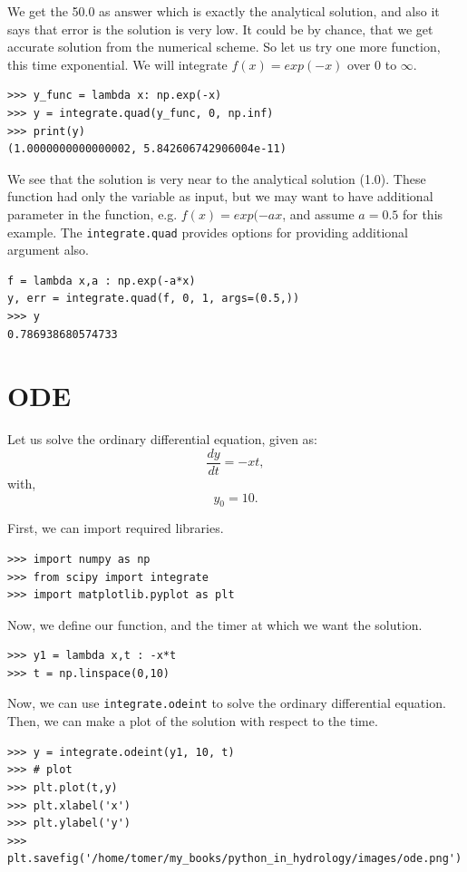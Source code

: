 \documentclass[10pt]{book}
\begin{document}
{We get the 50.0 as answer which is exactly the analytical solution, and also it says that error is the solution is very low. It could be by chance, that we get accurate solution from the numerical scheme. So let us try one more function, this time exponential. We will integrate $f(x)=exp(-x)$ over 0 to $\infty$. 
\beforeverb \begin{verbatim}
>>> y_func = lambda x: np.exp(-x)
>>> y = integrate.quad(y_func, 0, np.inf)
>>> print(y)
(1.0000000000000002, 5.842606742906004e-11)
\end{verbatim} \afterverb
We see that the solution is very near to the analytical solution (1.0). These function had only the variable as input, but we may want to have additional parameter in the function, e.g. $f(x)=exp(-ax$, and assume $a=0.5$ for this example. The \verb"integrate.quad" provides options for providing additional argument also. 
\beforeverb \begin{verbatim}
f = lambda x,a : np.exp(-a*x)
y, err = integrate.quad(f, 0, 1, args=(0.5,))
>>> y
0.786938680574733
\end{verbatim} \afterverb


\section{ODE}
Let us solve the ordinary differential equation, given as:
\begin{equation}
\frac{dy}{dt} = -xt,
\end{equation}
with,
\begin{equation}
y_0 = 10.
\end{equation}

First, we can import required libraries.
\beforeverb \begin{verbatim}
>>> import numpy as np
>>> from scipy import integrate
>>> import matplotlib.pyplot as plt
\end{verbatim} \afterverb

Now, we define our function, and the timer at which we want the solution. 
\beforeverb \begin{verbatim}
>>> y1 = lambda x,t : -x*t
>>> t = np.linspace(0,10)
\end{verbatim} \afterverb

Now, we can use \verb"integrate.odeint" to solve the ordinary differential equation. Then, we can make a plot of the solution with respect to the time. 
\beforeverb \begin{verbatim}
>>> y = integrate.odeint(y1, 10, t)
>>> # plot
>>> plt.plot(t,y)
>>> plt.xlabel('x')
>>> plt.ylabel('y')
>>> plt.savefig('/home/tomer/my_books/python_in_hydrology/images/ode.png')
\end{verbatim} \afterverb

}
\end{document}
